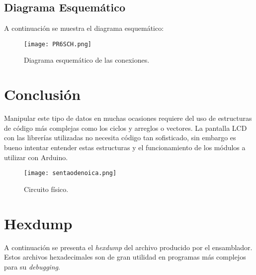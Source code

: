\documentclass[12pt, letterpaper]{article}
\begin{document}
\subsection*{Diagrama Esquemático}

A continuación se muestra el diagrama esquemático:

\begin{figure}[H]
	\centering
	\texttt{[image: PR6SCH.png]}
	\caption{Diagrama esquemático de las conexiones.}
\end{figure}

\section*{Conclusión}
Manipular este tipo de datos en muchas ocasiones requiere del uso de estructuras de código más complejas como los ciclos y arreglos o vectores. La pantalla LCD con las librerías utilizadas no necesita código tan sofisticado, sin embargo es bueno intentar entender estas estructuras y el funcionamiento de los módulos a utilizar con Arduino.

\begin{figure}[H]
	\centering
	\texttt{[image: sentaodenoica.png]}
	\caption{Circuito físico.}
\end{figure}
\section*{Hexdump}
A continuación se presenta el \textit{hexdump} del archivo producido por el ensamblador. Estos archivos hexadecimales son de gran utilidad en programas más complejos para su \textit{debugging}.

\scriptsize


\renewcommand\refname{References}
\printbibliography
\end{document}

